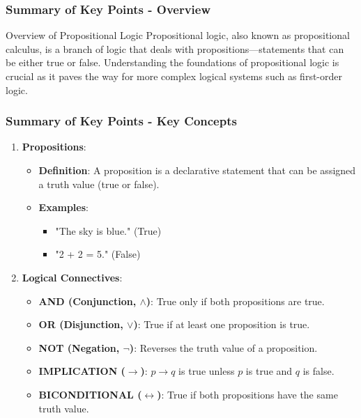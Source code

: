\documentclass[aspectratio=169]{beamer}
\begin{document}
\begin{frame}[fragile]
    \frametitle{Summary of Key Points - Overview}
    \begin{block}{Overview of Propositional Logic}
        Propositional logic, also known as propositional calculus, is a branch of logic that deals with propositions—statements that can be either true or false. Understanding the foundations of propositional logic is crucial as it paves the way for more complex logical systems such as first-order logic.
    \end{block}
\end{frame}

\begin{frame}[fragile]
    \frametitle{Summary of Key Points - Key Concepts}
    \begin{enumerate}
        \item \textbf{Propositions}:
            \begin{itemize}
                \item \textbf{Definition}: A proposition is a declarative statement that can be assigned a truth value (true or false).
                \item \textbf{Examples}:
                    \begin{itemize}
                        \item "The sky is blue." (True)
                        \item "2 + 2 = 5." (False)
                    \end{itemize}
            \end{itemize}

        \item \textbf{Logical Connectives}:
            \begin{itemize}
                \item \textbf{AND (Conjunction, $\land$)}: True only if both propositions are true.
                \item \textbf{OR (Disjunction, $\lor$)}: True if at least one proposition is true.
                \item \textbf{NOT (Negation, $\neg$)}: Reverses the truth value of a proposition.
                \item \textbf{IMPLICATION ($\rightarrow$)}: $p \rightarrow q$ is true unless $p$ is true and $q$ is false.
                \item \textbf{BICONDITIONAL ($\leftrightarrow$)}: True if both propositions have the same truth value.
            \end{itemize}
    \end{enumerate}
\end{frame}
\end{document}
